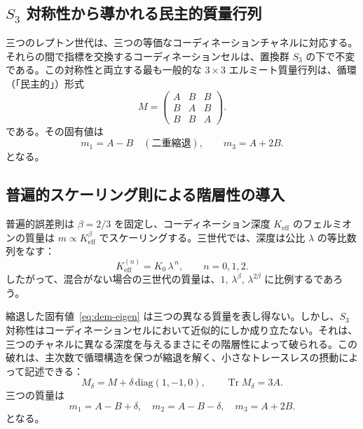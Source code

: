 \documentclass[11pt,a4paper]{article}
\theoremstyle{remark}
\begin{document}
	\subsection{\(S_3\) 対称性から導かれる民主的質量行列}
	
	三つのレプトン世代は、三つの等価なコーディネーションチャネルに対応する。それらの間で指標を交換するコーディネーションセルは、置換群 \(S_3\) の下で不変である。この対称性と両立する最も一般的な \(3\times3\) エルミート質量行列は、循環（「民主的」）形式
	\begin{equation}
		M = \begin{pmatrix}
			A & B & B \\
			B & A & B \\
			B & B & A
		\end{pmatrix}.
		\label{eq:democratic}
	\end{equation}
	である。その固有値は
	\begin{equation}
		m_1 = A - B \quad (\text{二重縮退}), \qquad
		m_3 = A + 2B .
		\label{eq:dem-eigen}
	\end{equation}
	となる。
	
	\subsection{普遍的スケーリング則による階層性の導入}
	
	普遍的誤差則は \(\beta = 2/3\) を固定し、コーディネーション深度 \(K_{\mathrm{eff}}\) のフェルミオンの質量は \(m \propto K_{\mathrm{eff}}^{\beta}\) でスケーリングする。三世代では、深度は公比 \(\lambda\) の等比数列をなす：
	\[
	K_{\mathrm{eff}}^{(n)} = K_0 \, \lambda^{\,n}, \qquad n = 0,1,2 .
	\]
	したがって、混合がない場合の三世代の質量は、\(1\), \(\lambda^{\beta}\), \(\lambda^{2\beta}\) に比例するであろう。
	
	縮退した固有値~\eqref{eq:dem-eigen} は三つの異なる質量を表し得ない。しかし、\(S_3\) 対称性はコーディネーションセルにおいて近似的にしか成り立たない。それは、三つのチャネルに異なる深度を与えるまさにその階層性によって破られる。この破れは、主次数で循環構造を保つが縮退を解く、小さなトレースレスの摂動によって記述できる：
	\begin{equation}
		M_\delta = M + \delta \,\mathrm{diag}(1,-1,0), \qquad \operatorname{Tr} M_\delta = 3A .
	\end{equation}
	三つの質量は
	\begin{equation}
		m_1 = A - B + \delta, \quad
		m_2 = A - B - \delta, \quad
		m_3 = A + 2B .
		\label{eq:three-masses}
	\end{equation}
	となる。
	
\end{document}
